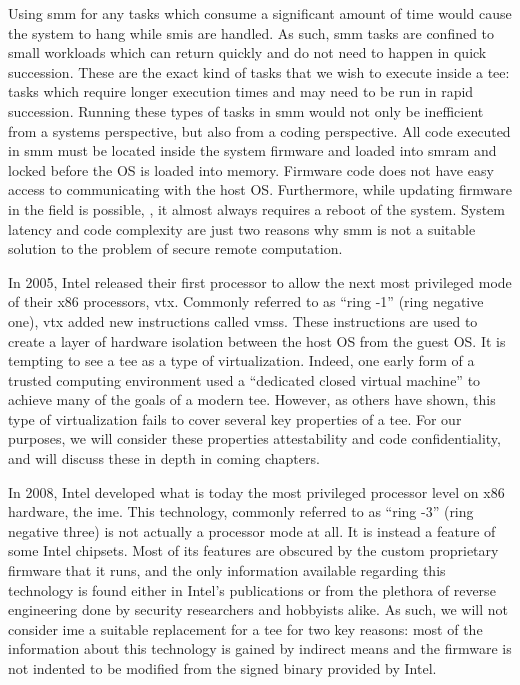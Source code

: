 Using \gls{smm} for any tasks which consume a significant amount of time would cause the system to hang while \glspl{smi} are handled. As such, \gls{smm} tasks are confined to small workloads which can return quickly and do not need to happen in quick succession. These are the exact kind of tasks that we wish to execute inside a \gls{tee}: tasks which require longer execution times and may need to be run in rapid succession. Running these types of tasks in \gls{smm} would not only be inefficient from a systems perspective, but also from a coding perspective. All code executed in \gls{smm} must be located inside the system firmware and loaded into \gls{smram} and locked before the OS is loaded into memory. Firmware code does not have easy access to communicating with the host OS. Furthermore, while updating firmware in the field is possible, \cite{zimmer2011apparatus}, it almost always requires a reboot of the system. System latency and code complexity are just two reasons why \gls{smm} is not a suitable solution to the problem of secure remote computation.

In 2005, \cite{uhlig2005intel} Intel released their first processor to allow the next most privileged mode of their x86 processors, \gls{vtx}. Commonly referred to as ``ring -1'' (ring negative one), \gls{vtx} added new instructions called \glspl{vms}. These instructions are used to create a layer of hardware isolation between the host OS from the guest OS. It is tempting to see a \gls{tee} as a type of virtualization. Indeed, one early form of a trusted computing environment used a ``dedicated closed virtual machine'' \cite{garfinkel2003terra} to achieve many of the goals of a modern \gls{tee}. However, as others have shown, \cite{teeWhatIsIt} this type of virtualization fails to cover several key properties of a \gls{tee}. For our purposes, we will consider these properties attestability and code confidentiality, and will discuss these in depth in coming chapters.

In 2008, \cite{eldar2008configuring} Intel developed what is today the most privileged processor level on x86 hardware, the \gls{ime}. This technology, commonly referred to as ``ring -3'' (ring negative three) is not actually a processor mode at all. It is instead a feature of some Intel chipsets. Most of its features are obscured by the custom proprietary firmware that it runs, and the only information available regarding this technology is found either in Intel's publications or from the plethora of reverse engineering done by security researchers and hobbyists alike. As such, we will not consider \gls{ime} a suitable replacement for a \gls{tee} for two key reasons: most of the information about this technology is gained by indirect means and the firmware is not indented to be modified from the signed binary provided by Intel. 

